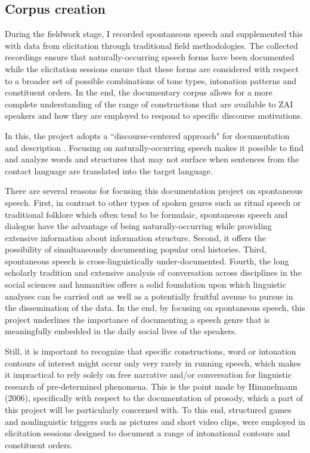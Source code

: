 \subsection{Corpus creation}

During the fieldwork stage, I recorded spontaneous speech and supplemented this with data from elicitation through traditional field methodologies. The collected recordings ensure that naturally-occurring speech forms have been documented while the elicitation sessions  ensure that these forms are considered with respect to a broader set of possible combinations of tone types, intonation patterns and constituent orders. In the end, the documentary corpus allows for a more complete understanding of the range of constructions that are available to ZAI speakers and how they are employed to respond to specific discourse motivations.

In this, the project adopts a ``discourse-centered approach" for documentation and description \citep{sherzer1987}. Focusing on naturally-occurring speech makes it possible to find and analyze words and structures that may not surface when sentences from the contact language are translated into the target language. 

There are several reasons for focusing this documentation project on spontaneous speech. First, in contrast to other types of spoken genres such as ritual speech or traditional folklore which often tend to be formulaic, spontaneous speech and dialogue have the advantage of being naturally-occurring while providing extensive information about information structure. Second, it offers the possibility of simultaneously documenting popular oral histories. Third, spontaneous speech is cross-linguistically under-documented. Fourth, the long scholarly tradition and extensive analysis of conversation across disciplines in the social sciences and humanities offers a solid foundation upon which linguistic analyses can be carried out as well as a potentially fruitful avenue to pursue in the dissemination of the data. In the end, by focusing on spontaneous speech, this project underlines the importance of documenting a speech genre that is meaningfully embedded in the daily social lives of the speakers. 

Still, it is important to recognize that specific constructions, word or intonation contours of interest might occur only very rarely in running speech, which makes it impractical to rely solely on free narrative and/or conversation for linguistic research of pre-determined phenomena. This is the point made by Himmelmann (2006), specifically with respect to the documentation of prosody, which a part of this project will be particularly concerned with. To this end, structured games and nonlinguistic triggers such as pictures and short video clips, were employed in elicitation sessions designed to document a range of intonational contours and constituent orders.

